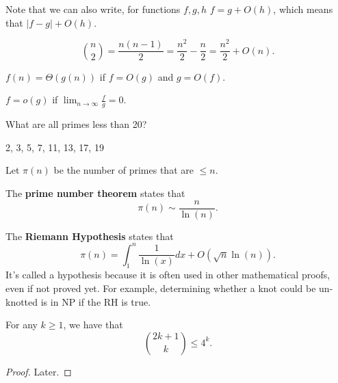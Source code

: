 
\begin{note}
	Note that we can also write, for functions \( f, g, h \) \( f = g + O(h) \), which means that \( |f - g| + O(h) \).
\end{note}

\begin{eg}
	\[ \binom{n}{2} = \frac{n(n-1)}{2} = \frac{n^{2}}{2} - \frac{n}{2} = \frac{n^{2}}{2} + O(n) .\]
\end{eg}

\begin{definition}
	\( f(n) = \Theta (g(n)) \) if \( f=O(g) \) and \( g=O(f) \).
\end{definition}

\begin{definition}
	\( f = o(g) \) if \( \lim_{n \to \infty} \frac{f}{g} = 0 \).
\end{definition}

\begin{eg}
	What are all primes less than 20?
\end{eg}
\begin{explanation}
	2, 3, 5, 7, 11, 13, 17, 19
\end{explanation}

\begin{definition}
	Let \( \pi (n) \) be the number of primes that are \( \le n \).
\end{definition}

\begin{theorem}
	The \textbf{prime number theorem} states that \[
		\pi (n) \sim \frac{n}{\ln (n)}
	.\] 
\end{theorem}

The \textbf{Riemann Hypothesis} states that \[
	\pi (n) = \int_{1}^{n}\frac{1}{\ln (x)} dx + O(\sqrt{n} \ln (n)) 
.\] It's called a hypothesis because it is often used in other mathematical proofs, even if not proved yet. For example, determining whether a knot could be un-knotted is in NP if the RH is true.

\begin{lemma}
	For any \( k\ge 1 \), we have that \[
		\binom{2k+1}{k} \le 4^{k} 
	.\] 
\end{lemma}
\begin{proof}
	Later.
\end{proof}

